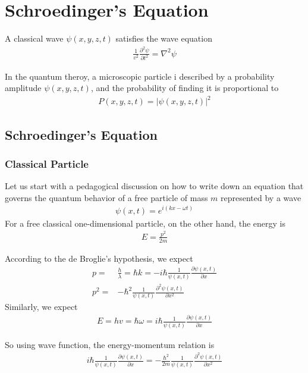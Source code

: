 \newpage
\section{Schroedinger’s Equation}
A classical wave $\psi(x,y,z,t)$ satisfies the wave equation
\begin{align*}
    \frac{1}{v^2}\frac{\partial^2\psi}{\partial t^2}=\nabla^2\psi
\end{align*}

In the quantum theroy, a microscopic particle i described by a probability amplitude $\psi(x,y,z,t)$, and the probability of finding it is proportional to 
\begin{align*}
    P(x,y,z,t)=|\psi(x,y,z,t)|^2
\end{align*}

\subsection{Schroedinger’s Equation}
\subsubsection{Classical Particle}
Let us start with a pedagogical discussion on how to write down an equation that governs the quantum behavior of a free particle of mass $m$ represented by a wave 
\begin{align*}
    \psi(x,t)=e^{i(kx-\omega t)}
\end{align*}
For a free classical one-dimensional particle, on the other hand, the energy is 
\begin{align*}
    E=\frac{p^2}{2m}
\end{align*}

According to the de Broglie's hypothesis, we expect
\begin{align*}
    p=&\frac{h}{\lambda}=\hbar k=-i\hbar \frac{1}{\psi(x,t)}\frac{\partial \psi(x,t)}{\partial x}\\
    p^2=&-\hbar^2\frac{1}{\psi(x,t)}\frac{\partial^2 \psi(x,t)}{\partial x^2}
\end{align*}
Similarly, we expect
\begin{align*}
    E=hv=\hbar \omega=i\hbar \frac{1}{\psi(x,t)}\frac{\partial \psi(x,t)}{\partial x}
\end{align*}


So using wave function, the energy-momentum relation is 
\begin{align*}
    i\hbar\frac{1}{\psi(x,t)}\frac{\partial \psi(x,t)}{\partial x}=-\frac{\hbar^2}{2m}\frac{1}{\psi(x,t)}\frac{\partial^2 \psi(x,t)}{\partial x^2}
\end{align*}

